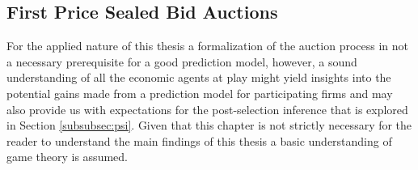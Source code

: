 \documentclass[a4paper,12pt, headsepline]{scrartcl}
\numberwithin{equation}{section}
\begin{document}
\subsection{First Price Sealed Bid Auctions}\label{subsec:fpsba}

For the applied nature of this thesis a formalization of the auction process in not a necessary prerequisite 
for a good prediction model, however, a sound understanding of all the economic agents at play might yield insights into the potential gains made from a prediction model for participating firms and may also provide us with expectations for the post-selection inference that is explored in Section \ref{subsubsec:psi}. Given that this chapter is not strictly necessary for the reader to understand the main findings of this thesis a basic understanding of game theory is assumed.\\
\end{document}
